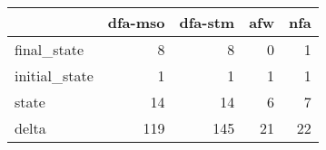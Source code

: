 \begin{tabular}{lrrrr}
\toprule
{} &  dfa-mso &  dfa-stm &  afw &  nfa \\
\midrule
final\_state   &        8 &        8 &    0 &    1 \\
initial\_state &        1 &        1 &    1 &    1 \\
state         &       14 &       14 &    6 &    7 \\
delta         &      119 &      145 &   21 &   22 \\
\bottomrule
\end{tabular}
